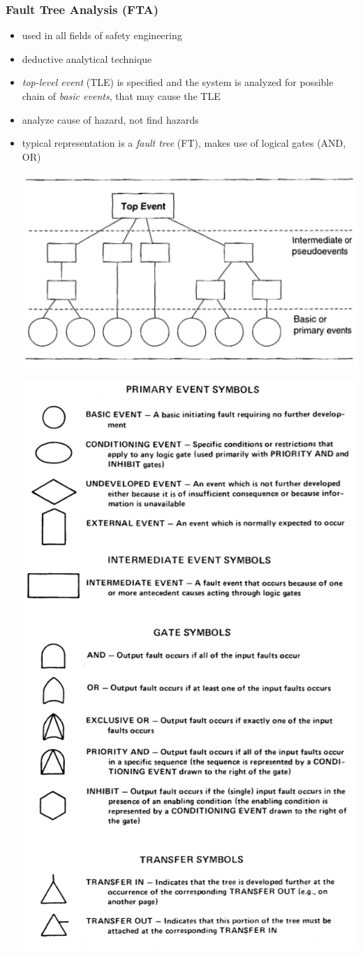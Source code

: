 \documentclass[a4paper, 10pt]{article}
\begin{document}
\subsubsection*{Fault Tree Analysis (FTA)}
\begin{itemize}
    \item used in all fields of safety engineering
    \item deductive analytical technique
    \item \emph{top-level event} (TLE) is specified and the system is analyzed for possible chain of \emph{basic events}, that may cause the TLE
    \item analyze cause of hazard, not find hazards
    \item typical representation is a \emph{fault tree} (FT), makes use of logical gates (AND, OR)
    \begin{center}
    \includegraphics[width=.49\textwidth]{images/FTsimple.png}
    \end{center}
    \newpage
    \begin{multicols}{2}
    \includegraphics[width=.49\textwidth]{images/FTsymbols.png}
    \columnbreak

\end{multicols}
\end{itemize}
\end{document}
